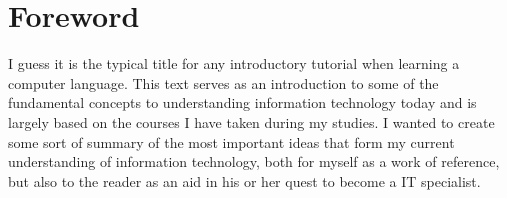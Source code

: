\chapter*{Foreword}\label{chapter:foreword}


I guess it is the typical title for any introductory tutorial when learning a computer language. This text serves as an introduction to some of the fundamental concepts to understanding information technology today and is largely based on the courses I have taken during my studies. I wanted to create some sort of summary of the most important ideas that form my current understanding of information technology, both for myself as a work of reference, but also to the reader as an aid in his or her quest to become a IT specialist.
